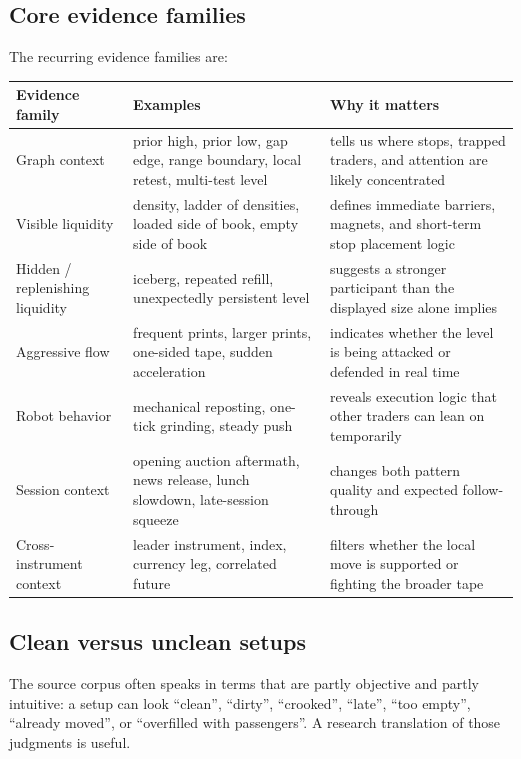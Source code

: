 \subsection{Core evidence families}

The recurring evidence families are:

\begin{longtable}{p{}p{}p{}}
\toprule
\textbf{Evidence family} & \textbf{Examples} & \textbf{Why it matters} \\
\midrule
Graph context & prior high, prior low, gap edge, range boundary, local retest, multi-test level & tells us where stops, trapped traders, and attention are likely concentrated \\
Visible liquidity & density, ladder of densities, loaded side of book, empty side of book & defines immediate barriers, magnets, and short-term stop placement logic \\
Hidden / replenishing liquidity & iceberg, repeated refill, unexpectedly persistent level & suggests a stronger participant than the displayed size alone implies \\
Aggressive flow & frequent prints, larger prints, one-sided tape, sudden acceleration & indicates whether the level is being attacked or defended in real time \\
Robot behavior & mechanical reposting, one-tick grinding, steady push & reveals execution logic that other traders can lean on temporarily \\
Session context & opening auction aftermath, news release, lunch slowdown, late-session squeeze & changes both pattern quality and expected follow-through \\
Cross-instrument context & leader instrument, index, currency leg, correlated future & filters whether the local move is supported or fighting the broader tape \\
\bottomrule
\end{longtable}

\subsection{Clean versus unclean setups}

The source corpus often speaks in terms that are partly objective and partly intuitive: a setup can look ``clean'', ``dirty'', ``crooked'', ``late'', ``too empty'', ``already moved'', or ``overfilled with passengers''. A research translation of those judgments is useful.

